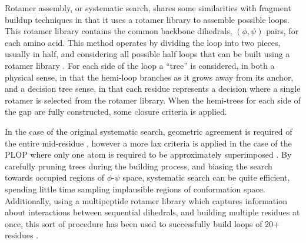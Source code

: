Rotamer assembly, or systematic search, shares some similarities with fragment buildup techniques in that it uses a rotamer library to assemble possible loops.
This rotamer library contains the common backbone dihedrals, $(\phi,\psi)$ pairs, for each amino acid.
This method operates by dividing the loop into two pieces, usually in half, and considering all possible half loops that can be built using a rotamer library \cite{moult1986algorithm}.
For each side of the loop a ``tree'' is considered, in both a physical sense, in that the hemi-loop branches as it grows away from its anchor, and a decision tree sense, in that each residue represents a decision where a single rotamer is selected from the rotamer library.
When the hemi-trees for each side of the gap are fully constructed, some closure criteria is applied.

In the case of the original systematic search, geometric agreement is required of the entire mid-residue \cite{moult1986algorithm}, however a more lax criteria is applied in the case of the PLOP where only one atom is required to be approximately superimposed \cite{jacobson2004hierarchical}.
By carefully pruning trees during the building process, and biasing the search towards occupied regions of $\phi$-$\psi$ space, systematic search can be quite efficient, spending little time sampling implausible regions of conformation space.
Additionally, using a multipeptide rotamer library which captures information about interactions between sequential dihedrals, and building multiple residues at once, this sort of procedure has been used to successfully build loops of 20+ residues \cite{zhao2011progress}.
